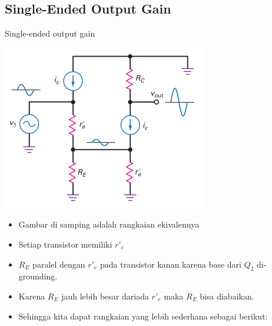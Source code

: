 \documentclass[aspectratio=169]{beamer}
\begin{document}
\subsection{Single-Ended Output Gain}
\begin{frame}{Single-ended output gain}
	\begin{multicols}{2}
		\begin{center}
			\includegraphics[height=0.7\textheight]{gambar/01.diff-amp/01.ac_equivalent_circuit}
		\end{center}
		\columnbreak
		\begin{itemize}
			\item Gambar di samping adalah rangkaian ekivalennya
			\item Setiap transistor memiliki $ r'_e $
			\item $ R_E $ paralel dengan $ r'_e $ pada transistor kanan karena base dari $ Q_2 $ di-grounding.
			\item Karena $ R_E $ jauh lebih besar dariada $ r'_e $ maka $ R_E $ bisa diabaikan.
			\item Sehingga kita dapat rangkaian yang lebih sederhana sebagai berikut:
		\end{itemize}
	\end{multicols}
\end{frame}
\end{document}
